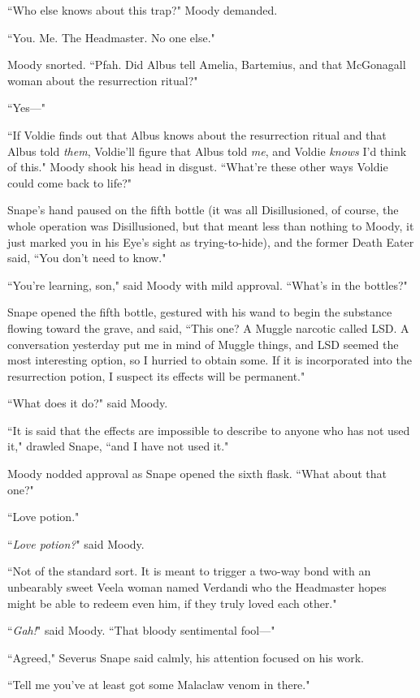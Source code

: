``Who else knows about this trap?" Moody demanded.

``You. Me. The Headmaster. No one else."

Moody snorted. ``Pfah. Did Albus tell Amelia, Bartemius, and that McGonagall woman about the resurrection ritual?"

``Yes---"

``If Voldie finds out that Albus knows about the resurrection ritual and that Albus told \emph{them}, Voldie'll figure that Albus told \emph{me}, and Voldie \emph{knows} I'd think of this." Moody shook his head in disgust. ``What're these other ways Voldie could come back to life?"

Snape's hand paused on the fifth bottle (it was all Disillusioned, of course, the whole operation was Disillusioned, but that meant less than nothing to Moody, it just marked you in his Eye's sight as trying-to-hide), and the former Death Eater said, ``You don't need to know."

``You're learning, son," said Moody with mild approval. ``What's in the bottles?"

Snape opened the fifth bottle, gestured with his wand to begin the substance flowing toward the grave, and said, ``This one? A Muggle narcotic called LSD. A conversation yesterday put me in mind of Muggle things, and LSD seemed the most interesting option, so I hurried to obtain some. If it is incorporated into the resurrection potion, I suspect its effects will be permanent."

``What does it do?" said Moody.

``It is said that the effects are impossible to describe to anyone who has not used it," drawled Snape, ``and I have not used it."

Moody nodded approval as Snape opened the sixth flask. ``What about that one?"

``Love potion."

``\emph{Love potion?}" said Moody.

``Not of the standard sort. It is meant to trigger a two-way bond with an unbearably sweet Veela woman named Verdandi who the Headmaster hopes might be able to redeem even him, if they truly loved each other."

``\emph{Gah!}" said Moody. ``That bloody sentimental fool---"

``Agreed," Severus Snape said calmly, his attention focused on his work.

``Tell me you've at least got some Malaclaw venom in there."


